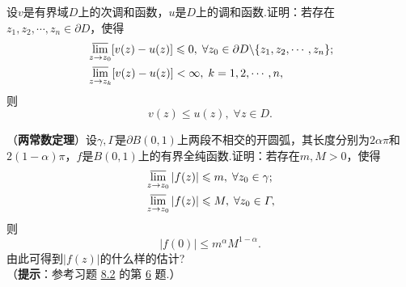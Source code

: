 \begin{xiti}
  \item 设$v$是有界域$D$上的次调和函数，$u$是$D$上的调和函数.证明：若存在$z_1,z_2,\cdots,z_n\in\partial D $，使得
      \begin{align*}
        & \varlimsup_{z\to z_0}[v(z)-u(z)]\le0,\;\forall z_0\in\partial D\backslash\{z_1,z_2,\cdots,z_n\};\\
        & \varlimsup_{z\to z_k}[v(z)-u(z)]<\infty,\;k=1,2,\cdots,n,
      \end{align*}
      则
      \[
        v(z) \le u(z),\;\forall z\in D.
      \]
  \item （\textbf{两常数定理}）设$\gamma,\Gamma$是$\partial B(0,1)$上两段不相交的开圆弧，其长度分别为$2\alpha\pi$和$2(1-\alpha)\pi$，$f$是$B(0,1)$上的有界全纯函数.证明：若存在$m,M>0$，使得
      \begin{align*}
        & \varlimsup_{z\to z_0}|f(z)|\le m,\;\forall z_0\in\gamma;\\
        & \varlimsup_{z\to z_0}|f(z)|\le M,\;\forall z_0\in\Gamma,
      \end{align*}
      则
      \[
        |f(0)| \le m^\alpha M^{1-\alpha}.
      \]
      由此可得到$|f(z)|$的什么样的估计?\\
     （\textbf{提示}：参考习题 \hyperlink{xiti8.2}{8.2} 的第 \hyperlink{xiti8.2.6}{6} 题.）
\end{xiti}
